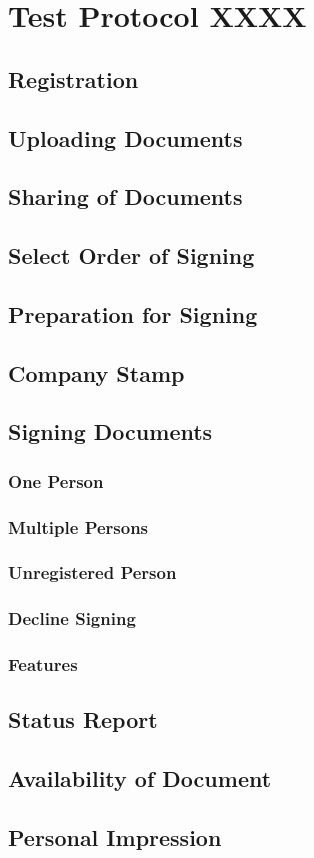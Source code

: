 \section{Test Protocol XXXX}

\subsection{Registration}

\subsection{Uploading Documents}

\subsection{Sharing of Documents}

\subsection{Select Order of Signing}

\subsection{Preparation for Signing}

\subsection{Company Stamp}

\subsection{Signing Documents}

\subsubsection{One Person}

\subsubsection{Multiple Persons}

\subsubsection{Unregistered Person}

\subsubsection{Decline Signing}

\subsubsection{Features}

\subsection{Status Report}

\subsection{Availability of Document}

\subsection{Personal Impression}